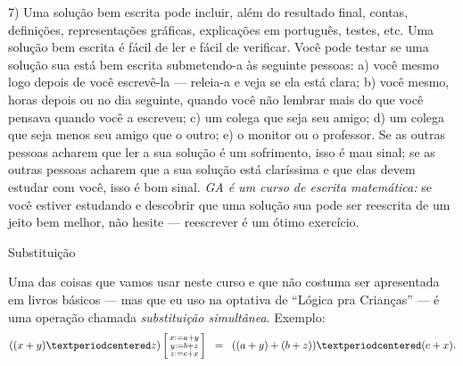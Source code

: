 \documentclass[oneside]{book}
\begin{document}
7) Uma solução bem escrita pode incluir, além do resultado final,
contas, definições, representações gráficas, explicações em português,
testes, etc. Uma solução bem escrita é fácil de ler e fácil de
verificar. Você pode testar se uma solução sua está bem escrita
submetendo-a às seguinte pessoas: a) você mesmo logo depois de você
escrevê-la --- releia-a e veja se ela está clara; b) você mesmo, horas
depois ou no dia seguinte, quando você não lembrar mais do que você
pensava quando você a escreveu; c) um colega que seja seu amigo; d) um
colega que seja menos seu amigo que o outro; e) o monitor ou o
professor. Se as outras pessoas acharem que ler a sua solução é um
sofrimento, isso é mau sinal; se as outras pessoas acharem que a sua
solução está claríssima e que elas devem estudar com você, isso é bom
sinal. {\sl GA é um curso de escrita matemática:} se você estiver
estudando e descobrir que uma solução sua pode ser reescrita de um
jeito bem melhor, não hesite --- reescrever é um ótimo exercício.

%




\newpage

%                                                          
 {Substituição}

Uma das coisas que vamos usar neste curso e que não costuma ser
apresentada em livros básicos --- mas que eu uso na optativa de
``Lógica pra Crianças'' --- é uma operação chamada {\sl substituição
  simultânea}. Exemplo:
%
$$((x+y)·z) \subst{ 
    x:=a+y \\
    y:=b+z \\
    z:=c+x \\
  }
  \;\;=\;\;
  ((a+y)+(b+z))·(c+x).
$$
\end{document}
